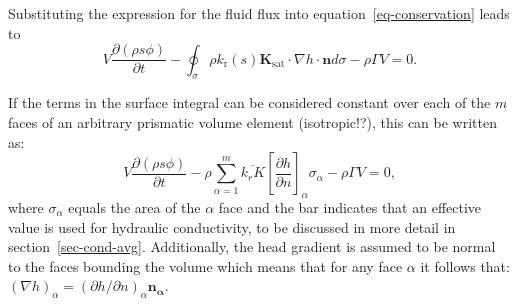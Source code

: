 \documentclass[fleqn]{article}
\begin{document}
Substituting the expression for the fluid flux into equation~\ref{eq-conservation}
leads to
\begin{equation}
  V \frac{\partial (\rho s \phi)}{\partial t} -
  \oint_\sigma \rho k_\text{r}(s) \mathbf{K}_{\textrm{sat}}
  \cdot \nabla h \cdot \mathbf{n} d\sigma -
  \rho \Gamma V = 0.
\end{equation}

If the terms in the surface integral can be considered constant over each of the 
$m$ faces of an arbitrary prismatic volume element (isotropic!?), 
this can be written as:
\begin{equation}
  V \frac{\partial (\rho s \phi)}{\partial t} -
  \rho \sum_{\alpha=1}^{m} \overline{k_r K}
  \left[\frac{\partial h}{\partial n}\right]_\alpha \sigma_\alpha -
  \rho \Gamma V = 0,
  \label{eq-diff-csv}
\end{equation}
where $\sigma_\alpha$ equals the area of the $\alpha$ face and the bar indicates 
that an effective value is used for hydraulic conductivity, to be discussed 
in more detail in section~\ref{sec-cond-avg}. Additionally, the head 
gradient is assumed to be normal to the faces bounding the volume which
means that for any face $\alpha$ it follows that:
$(\nabla h)_\alpha = (\partial h/\partial n)_\alpha \mathbf{n_\alpha}$.
\end{document}
